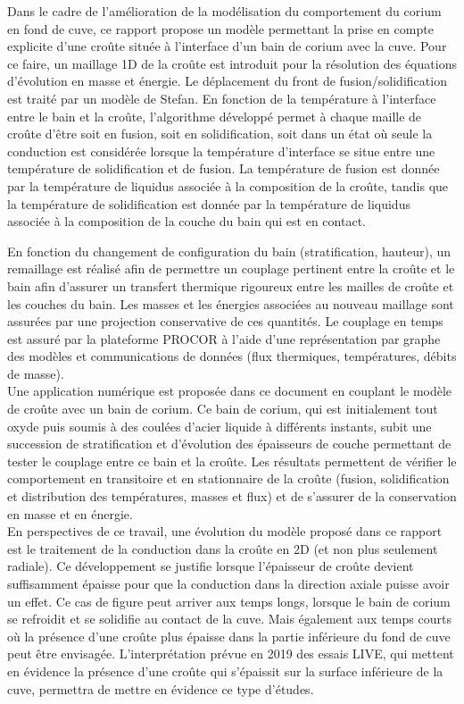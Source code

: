 Dans le cadre de l'amélioration de la modélisation du comportement du corium en fond de cuve, ce rapport propose un modèle permettant la prise en compte explicite d'une croûte située à l'interface d'un bain de corium avec la cuve. Pour ce faire, un maillage 1D de la croûte est introduit pour la résolution des équations d'évolution en masse et énergie. Le déplacement du front de fusion/solidification est traité par un modèle de Stefan. En fonction de la température à l'interface entre le bain et la croûte, l'algorithme développé permet à chaque maille de croûte d'être soit en fusion, soit en solidification, soit dans un état où seule la conduction est considérée lorsque la température d'interface se situe entre une température de solidification et de fusion. La température de fusion est donnée par la température de liquidus associée à la composition de la croûte, tandis que la température de solidification est donnée par la température de liquidus associée à la composition de la couche du bain qui est en contact. 

En fonction du changement de configuration du bain (stratification, hauteur), un remaillage est réalisé afin de permettre un couplage pertinent entre la croûte et le bain afin d'assurer un transfert thermique rigoureux entre les mailles de croûte et les couches du bain. Les masses et les énergies associées au nouveau maillage sont assurées par une projection conservative de ces quantités. Le couplage en temps est assuré par la plateforme PROCOR à l'aide d'une représentation par graphe des modèles et communications de données (flux thermiques, températures, débits de masse).\\

Une application numérique est proposée dans ce document en couplant le modèle de croûte avec un bain de corium. Ce bain de corium, qui est initialement tout oxyde puis soumis à des coulées d'acier liquide à différents instants, subit une succession de stratification et d'évolution des épaisseurs de couche permettant de tester le couplage entre ce bain et la croûte. Les résultats permettent de vérifier le comportement en transitoire et en stationnaire de la croûte (fusion, solidification et distribution des températures, masses et flux) et de s'assurer de la conservation en masse et en énergie.\\

En perspectives de ce travail, une évolution du modèle proposé dans ce rapport est le traitement de la conduction dans la croûte en 2D (et non plus seulement radiale). Ce développement se justifie lorsque l'épaisseur de croûte devient suffisamment épaisse pour que la conduction dans la direction axiale puisse avoir un effet. Ce cas de figure peut arriver aux temps longs, lorsque le bain de corium se refroidit et se solidifie au contact de la cuve. Mais également aux temps courts où la présence d'une croûte plus épaisse dans la partie inférieure du fond de cuve peut être envisagée. L'interprétation prévue en 2019 des essais LIVE, qui mettent en évidence la présence d'une croûte qui s'épaissit sur la surface inférieure de la cuve, permettra de mettre en évidence ce type d'études. 

